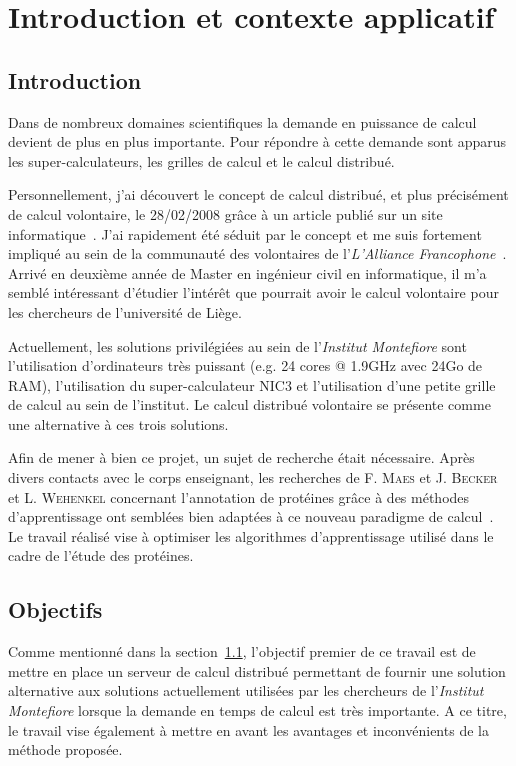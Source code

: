 \documentclass[a4paper, 11pt]{report}
\begin{document}
\newpage
\tableofcontents
\newpage

\chapter{Introduction et contexte applicatif}

\section{Introduction}
\label{intro}
Dans de nombreux domaines scientifiques la demande en puissance de calcul devient de plus en plus importante. Pour répondre à cette demande sont apparus les super-calculateurs, les grilles de calcul et le calcul distribué.

Personnellement, j'ai découvert le concept de calcul distribué, et plus précisément de calcul volontaire, le 28/02/2008 grâce à un article publié sur un site informatique~\cite{MACG}. J'ai rapidement été séduit par le concept et me suis fortement impliqué au sein de la communauté des volontaires de l'\textit{L'Alliance Francophone}~\cite{AF}. Arrivé en deuxième année de Master en ingénieur civil en informatique, il m'a semblé intéressant d'étudier l'intérêt que pourrait avoir le calcul volontaire pour les chercheurs de l'université de Liège. 

Actuellement, les solutions privilégiées au sein de l'\textit{Institut Montefiore} sont l'utilisation d'ordinateurs très puissant (e.g. 24 cores @ 1.9GHz avec 24Go de RAM), l'utilisation du super-calculateur NIC3 et l'utilisation d'une petite grille de calcul au sein de l'institut. Le calcul distribué volontaire se présente comme une alternative à ces trois solutions.

Afin de mener à bien ce projet, un sujet de recherche était nécessaire. Après divers contacts avec le corps enseignant, les recherches de F. \textsc{Maes} et J. \textsc{Becker} et L. \textsc{Wehenkel} concernant l'annotation de protéines grâce à des méthodes d'apprentissage ont semblées bien adaptées à ce nouveau paradigme de calcul~\cite{POSTER}\cite{CAP}. Le travail réalisé vise à optimiser les algorithmes d'apprentissage utilisé dans le cadre de l'étude des protéines.

\section{Objectifs}
\label{objectifs}
Comme mentionné dans la section~\ref{intro}, l'objectif premier de ce travail est de mettre en place un serveur de calcul distribué permettant de fournir une solution alternative aux solutions actuellement utilisées par les chercheurs de l'\textit{Institut Montefiore} lorsque la demande en temps de calcul est très importante. A ce titre, le travail vise également à mettre en avant les avantages et inconvénients de la méthode proposée.
\end{document}
